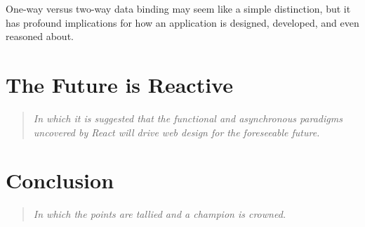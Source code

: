 \documentclass[12pt,letterpaper]{article}
\begin{document}
One-way versus two-way data binding may seem like a simple distinction, but it has profound implications for how an application is designed, developed, and even reasoned about.












\section{The Future is Reactive}
\vspace{-12pt}

\begin{quote}
	\singlespacing
	\emph{In which it is suggested that the functional and asynchronous paradigms uncovered by React will drive web design for the foreseeable future.}
\end{quote}




\section{Conclusion}
\vspace{-12pt}

\begin{quote}
	\singlespacing
	\emph{In which the points are tallied and a champion is crowned.}
\end{quote}










\end{document}
